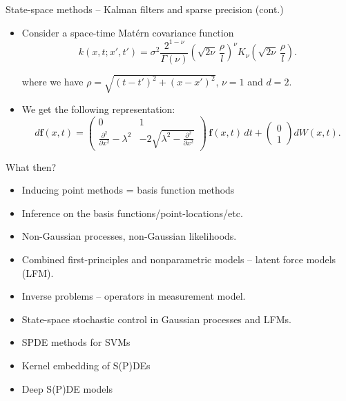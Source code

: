 \documentclass[first=dgreen,second=purple,presentation]{elecslides}
\begin{document}
\begin{frame}{State-space methods -- Kalman filters and sparse precision (cont.)}
\begin{example}
%
\begin{itemize}[<+->]
\item Consider a space-time Mat\'ern covariance function
%
  $$ k(x,t;x',t') = \sigma^2\frac{2^{1-\nu}}{\Gamma(\nu)}\left(\sqrt{2\nu}\,\frac{\rho}{
l}\right)^\nu K_\nu\left(\sqrt{2\nu}\,\frac{\rho}{l}\right). $$

where we have $\rho = \sqrt{(t-t')^2+ (x-x')^2}$, $\nu=1$ and $d=2$.

\item We get the following representation:
%
\begin{equation}
  d\mathbf{f}(x,t) = 
       \begin{pmatrix} 
        0 & 1 \\ 
        \frac{\partial^2}{\partial x^2} - \lambda^2
        & -2 \sqrt{\lambda^2 - \frac{\partial^2}{\partial x^2}}
      \end{pmatrix} \, \mathbf{f}(x,t) \, dt+ \begin{pmatrix} 0 \\ 1 \end{pmatrix} dW(x,t).
\nonumber
\end{equation}
%

%
%
\end{itemize}
\end{example}

\end{frame}


\begin{frame}{What then?}

\begin{itemize}[<+->]
\item \alert{Inducing point} methods = basis function methods
\item \alert{Inference} on the basis functions/point-locations/etc.
\item \alert{Non-Gaussian} processes, non-Gaussian likelihoods.
\item \alert{Combined first-principles} and nonparametric models -- latent force models (LFM).
\item \alert{Inverse problems} -- operators in measurement model.
\item \alert{State-space stochastic control} in Gaussian processes and LFMs.
\item \alert{SPDE methods for SVMs}
\item \alert{Kernel embedding of S(P)DEs}
\item \alert{Deep S(P)DE models}
\end{itemize}

\end{frame}


\end{document}

